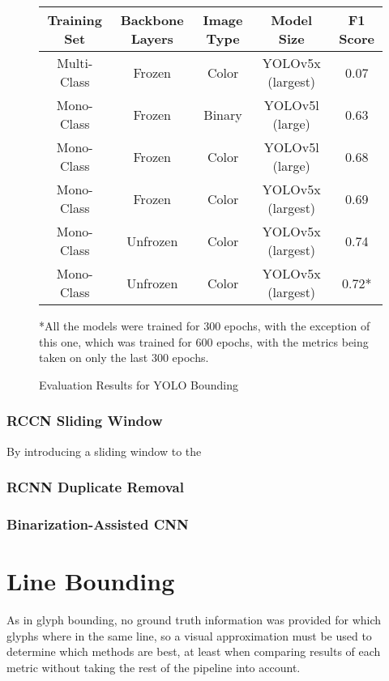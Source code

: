 \begin{figure}[H]
    \caption{Evaluation Results for YOLO Bounding}
    \label{fig:evalYOLORaw}
    \centering
    \begin{tabular}{ | c | c | c | c | c | }
        \hline
        Training Set & Backbone Layers & Image Type & Model Size & F1 Score \\
        \hline
        Multi-Class & Frozen & Color & YOLOv5x (largest) & 0.07 \\
        Mono-Class & Frozen & Binary & YOLOv5l (large) & 0.63 \\
        Mono-Class & Frozen & Color & YOLOv5l (large) & 0.68 \\
        Mono-Class & Frozen & Color & YOLOv5x (largest) & 0.69 \\
        Mono-Class & Unfrozen & Color & YOLOv5x (largest) & 0.74 \\
        Mono-Class & Unfrozen & Color & YOLOv5x (largest) & 0.72* \\
        \hline
    \end{tabular}
    *All the models were trained for 300 epochs, with the exception of this one, which was trained for 600 epochs, with the metrics being taken on only the last 300 epochs.
\end{figure}

\subsubsection{RCCN Sliding Window}

By introducing a sliding window to the

\subsubsection{RCNN Duplicate Removal}

\subsubsection{Binarization-Assisted CNN}

\section{Line Bounding}

As in glyph bounding, no ground truth information was provided for which glyphs where in the same line, so a visual approximation must be used to determine which methods are best, at least when comparing results of each metric without taking the rest of the pipeline into account.

